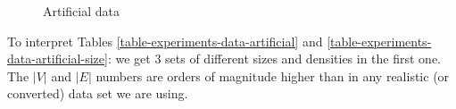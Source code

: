\begin{figure}
  \caption{Artificial data}
  \label{image-experiments-data-artificial}
  \centering
\end{figure}

To interpret Tables \ref{table-experiments-data-artificial} and \ref{table-experiments-data-artificial-size}: we get 3 sets of different sizes and densities in the first one. The $|V|$ and $|E|$ numbers are orders of magnitude higher than in any realistic (or converted) data set we are using.

